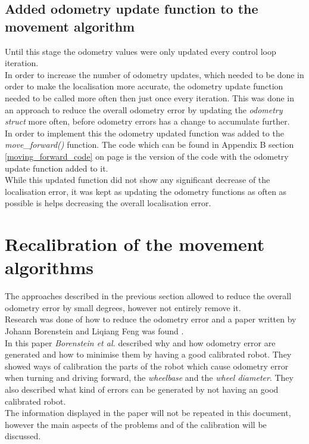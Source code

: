 \subsection{Added odometry update function to the movement algorithm}
Until this stage the odometry values were only updated every control loop iteration. \\
In order to increase the number of odometry updates, which needed to be done in order to make the localisation more accurate, the odometry update function needed to be called more often then just once every iteration.
This was done in an approach to reduce the overall odometry error  by updating the \textit{odometry struct} more often, before odometry errors has a change to accumulate further. \\[3ex]

In order to implement this the odometry updated function was added to the \textit{move\_forward()} function. 
The code which can be found in Appendix B section \ref{moving_forward_code} on page \pageref{moving_forward_code} is the version of the code with the odometry update function added to it. \\
While this updated function did not show any significant decrease of the localisation error, it was kept as updating the odometry functions as often as possible is helps decreasing the overall localisation error. 

\section{Recalibration of the movement algorithms}
The approaches described in the previous section allowed to reduce the overall odometry error by small degrees, however not entirely remove it. \\
Research was done of how to reduce the odometry error and a paper written by Johann Borenstein and Liqiang Feng was found \cite{Borenstein1996Measurement}.\\

In this paper \textit{Borenstein et al.} described why and how odometry error are generated and how to minimise them by having a good calibrated robot. 
They showed ways of calibration the parts of the robot which cause odometry error when turning and driving forward, the \textit{wheelbase} and the \textit{wheel diameter}. 
They also described what kind of errors can be generated by not having an good calibrated robot.\\
The information displayed in the paper will not be repeated in this document, however the main aspects of the problems and of the calibration will be discussed.\\

